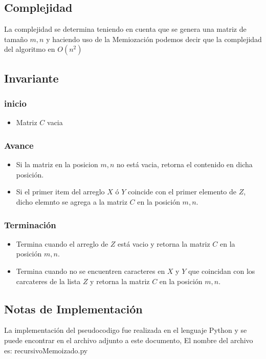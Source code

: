 \documentclass[]{article}
\numberwithin{equation}{section}
\numberwithin{figure}{section}
\theoremstyle{definition}
\begin{document}
	\subsection*{Complejidad}
	
	 \text La complejidad se determina teniendo en cuenta que se genera una matriz de tamaño $m,n$ y haciendo uso de la Memiozación podemos decir que la complejidad del algoritmo en $O(n^2)$
	
	\subsection*{Invariante}
	
	\subsubsection*{inicio}
	\begin{itemize}
	\item Matriz $C$ vacia
	\end{itemize}
	\subsubsection*{Avance}
	\begin{itemize}
	\item Si la matriz en la posicion $m,n$ no está vacia, retorna el contenido en dicha posición. 
	\item Si el primer item del arreglo $X$ ó $Y$ coincide con el primer elemento de $Z$, dicho elemnto se agrega a la matriz $C$ en la posición $m,n$.
	\end{itemize}
	\subsubsection*{Terminación}
	\begin{itemize}
	\item Termina cuando el arreglo de $Z$ está vacio y retorna la matriz $C$ en la posición $m,n$.
	\item Termina cuando no se encuentren caracteres en $X$ y $Y$ que coincidan con los carcateres de la lista $Z$ y retorna la matriz $C$ en la posición $m,n$.
	\end{itemize}
	
	\subsection*{Notas de Implementación}
	
	\text La implementación del pseudocodigo fue realizada en el lenguaje Python y se puede encontrar en el archivo adjunto a este documento, El nombre del archivo es: recursivoMemoizado.py
\end{document}
